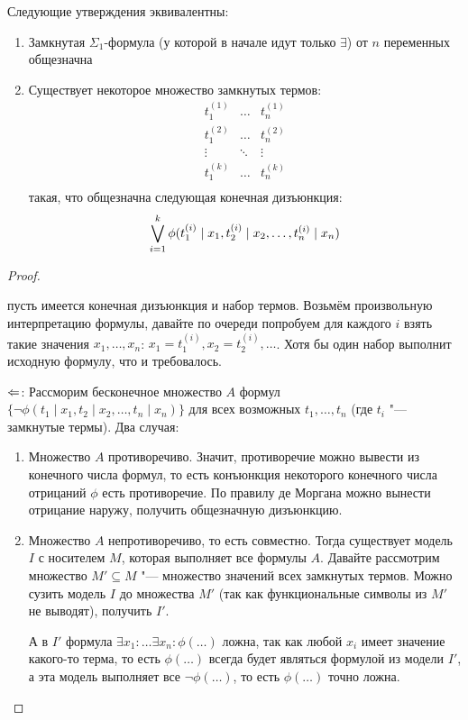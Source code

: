 \begin{theorem}[Эрбрана]
	Следующие утверждения эквивалентны:
	\begin{enumerate}
		\item
			Замкнутая $\Sigma_1$-формула (у которой в начале идут только $\exists$) от $n$ переменных общезначна
		\item
			Существует некоторое множество замкнутых термов:
			\[
			\begin{array}{ccc}
			t_1^{(1)} & \dots & t_n^{(1)} \\
			t_1^{(2)} & \dots & t_n^{(2)} \\
			\vdots & \ddots & \vdots \\
			t_1^{(k)} & \dots & t_n^{(k)} \\
			\end{array}
			\]
			такая, что общезначна следующая конечная дизъюнкция:
			\[
				\bigvee_{i=1}^k
					\phi(t_1^{(i)}\mid x_1, t_2^{(i)} \mid x_2, \dots, t_n^{(i)} \mid x_n)
			\]
	\end{enumerate}
\end{theorem}
\begin{proof}
	\begin{description}
		\item[$\Ra$:]
			пусть имеется конечная дизъюнкция и набор термов.
			Возьмём произвольную интерпретацию формулы, давайте по очереди попробуем
			для каждого $i$ взять такие значения $x_1, \dots, x_n$:
			$x_1=t_1^{(i)}, x_2=t_2^{(i)}, \dots$.
			Хотя бы один набор выполнит исходную формулу, что и требовалось.
		\item{$\Leftarrow$:}
			Рассморим бесконечное множество $A$ формул $\{ \lnot \phi(t_1 \mid x_1, t_2 \mid x_2, \dots, t_n \mid x_n) \}$
			для всех возможных $t_1, \dots, t_n$ (где $t_i$ "--- замкнутые термы).
			Два случая:
			\begin{enumerate}
				\item
					Множество $A$ противоречиво.
					Значит, противоречие можно вывести из конечного числа формул,
					то есть конъюнкция некоторого конечного числа отрицаний $\phi$ есть противоречие.
					По правилу де Моргана можно вынести отрицание наружу, получить общезначную дизъюнкцию.
				\item
					Множество $A$ непротиворечиво, то есть совместно.
					Тогда существует модель $I$ с носителем $M$, которая выполняет все формулы $A$.
					Давайте рассмотрим множество $M' \subseteq M$ "--- множество значений всех
					замкнутых термов.
					Можно сузить модель $I$ до множества $M'$ (так как функциональные символы из $M'$
					не выводят), получить $I'$.

					А в $I'$ формула $\exists x_1 \colon \dots \exists x_n \colon \phi(\dots)$ ложна,
					так как любой $x_i$ имеет значение какого-то терма, то есть $\phi(\dots)$ всегда
					будет являться формулой из модели $I'$, а эта модель выполняет все $\lnot \phi(\dots)$,
					то есть $\phi(\dots)$ точно ложна.
			\end{enumerate}
	\end{description}
\end{proof}

